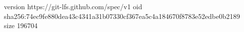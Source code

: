 version https://git-lfs.github.com/spec/v1
oid sha256:74ec9fe880dea43c4341a31b07330cf367ea5c4a184670f8783e52edbe0b2189
size 196704

